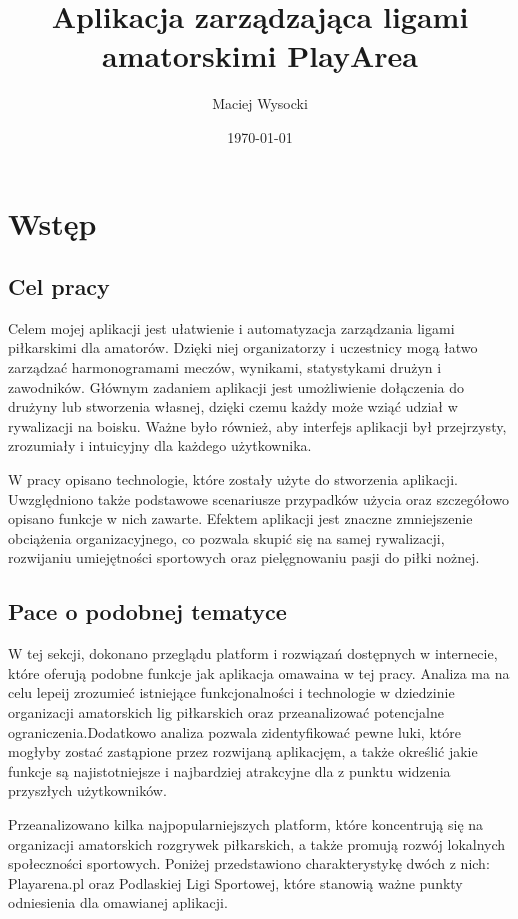 \documentclass[wmii,inf,inz]{uwmthesis} %
\title{Aplikacja zarządzająca ligami amatorskimi PlayArea}
\author{Maciej Wysocki}
\date{\today}
\begin{document}
\maketitle

\tableofcontents
\newpage

\chapter{Wstęp}


\section{Cel pracy}
Celem mojej aplikacji jest ułatwienie i automatyzacja zarządzania ligami piłkarskimi dla amatorów. Dzięki niej organizatorzy i uczestnicy mogą łatwo zarządzać harmonogramami meczów, wynikami, statystykami drużyn i zawodników. Głównym zadaniem aplikacji jest umożliwienie dołączenia do drużyny lub stworzenia własnej, dzięki czemu każdy może wziąć udział w rywalizacji na boisku. Ważne było również, aby interfejs aplikacji był przejrzysty, zrozumiały i intuicyjny dla każdego użytkownika.

W pracy opisano technologie, które zostały użyte do stworzenia aplikacji. Uwzględniono także podstawowe scenariusze przypadków użycia oraz szczegółowo opisano funkcje w nich zawarte. Efektem aplikacji jest znaczne zmniejszenie obciążenia organizacyjnego, co pozwala skupić się na samej rywalizacji, rozwijaniu umiejętności sportowych oraz pielęgnowaniu pasji do piłki nożnej.
\section{Pace o podobnej tematyce}
W tej sekcji, dokonano przeglądu platform i rozwiązań dostępnych w internecie, które oferują podobne funkcje jak aplikacja omawaina w tej pracy. Analiza ma na celu lepeij zrozumieć istniejące funkcjonalności i technologie w dziedzinie organizacji amatorskich lig piłkarskich oraz przeanalizować potencjalne ograniczenia.Dodatkowo analiza pozwala zidentyfikować pewne luki, które mogłyby zostać zastąpione przez rozwijaną aplikacjęm, a także określić jakie funkcje są najistotniejsze i najbardziej atrakcyjne dla z punktu widzenia przyszłych użytkowników.

Przeanalizowano kilka najpopularniejszych platform, które koncentrują się na organizacji amatorskich rozgrywek piłkarskich, a także promują rozwój lokalnych społeczności sportowych. Poniżej przedstawiono charakterystykę dwóch z nich: Playarena.pl oraz Podlaskiej Ligi Sportowej, które stanowią ważne punkty odniesienia dla omawianej aplikacji.
\end{document}
